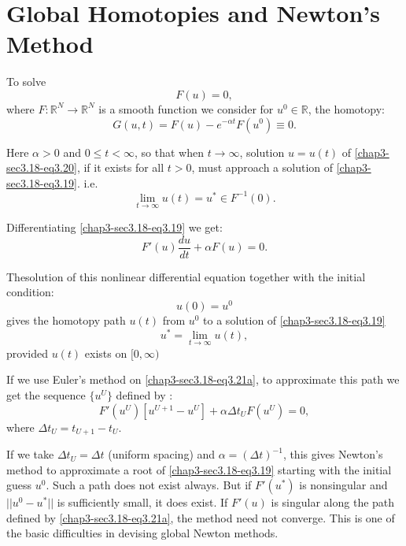 \section{Global Homotopies and Newton's Method}\label{chap3-sec3.18}%

To solve 
\begin{equation*}
F(u) = 0, \tag{3.19}\label{chap3-sec3.18-eq3.19}
\end{equation*}
where $F: \mathbb{R}^N \to \mathbb{R}^N $ is a smooth function we
consider for $u^0 \in\mathbb{R}$, the homotopy: 
\begin{equation*}
G(u,t) = F(u) - e^{-\alpha t} F(u^0) \equiv
0. \tag{3.20}\label{chap3-sec3.18-eq3.20} 
\end{equation*}

Here $\alpha > 0$ and $0 \leq t < \infty$, so that when $t \to
\infty$, solution $u = u(t)$ of \eqref{chap3-sec3.18-eq3.20}, if it
exists for all $t > 
0$, must approach a solution of \eqref{chap3-sec3.18-eq3.19}. i.e. 
$$
\lim_{t \to \infty} u(t) = u^* \in F^{-1}(0).
$$

Differentiating \eqref{chap3-sec3.18-eq3.19} we get:
\begin{equation*}
F'(u) \frac{du}{dt}+ \alpha F (u) =
0. \tag{3.21a}\label{chap3-sec3.18-eq3.21a} 
\end{equation*}

The\pageoriginale solution of this nonlinear differential equation together with the
initial condition: 
\begin{equation*}
u(0) = u^0 \tag{3.21b}\label{chap3-sec3.18-eq3.21b}
\end{equation*}
gives the homotopy path $u(t)$ from $u^0$ to a solution
of \eqref{chap3-sec3.18-eq3.19} 
\begin{equation*}
u^* = \lim_{t \to \infty}u(t),
\end{equation*}
provided $u(t)$ exists on $[0,\infty)$

If we use Euler's method on \eqref{chap3-sec3.18-eq3.21a}, to
approximate this path we get the sequence $\{ u^U \}$ defined by : 
$$
F' (u^U) [ u^{U+1} -u^U] + \alpha \Delta t_U F(u^U) = 0, 
$$
where $\Delta t_U = t_{U+1} - t_U$.  

If we take $\Delta t_U = \Delta t$ (uniform spacing) and $\alpha =
(\Delta t)^{-1}$, this gives Newton's method to approximate a root of
\eqref{chap3-sec3.18-eq3.19} starting with the initial guess
$u^0$. Such a path does not 
exist always. But if $F'(u^*)$ is nonsingular and $|| u^0 -u^*||$ is
sufficiently small, it does exist. If $F'(u)$ is singular along the
path defined by \eqref{chap3-sec3.18-eq3.21a}, the method need not
converge. This is one of the basic difficulties in devising global
Newton methods.  

